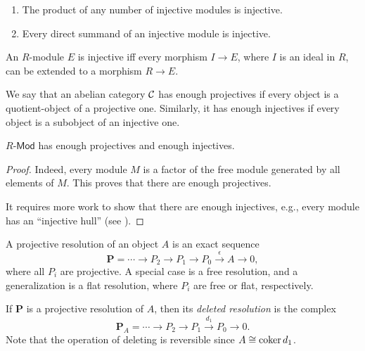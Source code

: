 \begin{prop}
    \begin{enumerate}
        \item The product of any number of injective modules is injective.
        \item Every direct summand of an injective module is injective.
    \end{enumerate}
\end{prop}

\begin{thm}
    An $R$-module $E$ is injective iff every morphism $I\to E$, where $I$ is an ideal in $R$, can be extended to a morphism $R\to E$.
\end{thm}


\begin{defn}
    We say that an abelian category $\mathcal{C}$ has enough projectives if every object is a quotient-object of a projective one. Similarly, it has enough injectives if every object is a subobject of an injective one.
\end{defn}

\begin{prop}
    $R\text{-}\mathsf{Mod}$ has enough projectives and enough injectives. 
\end{prop}
\begin{proof}
     Indeed, every module $M$ is a factor of the free module generated by all elements of $M$. This proves that there are enough projectives. 
     
     It requires more work to show that there are enough injectives, e.g., every module has an ``injective hull'' (see \cite[Thm. 3.38]{Rotman}).
\end{proof}

\begin{defn}
    A projective resolution of an object $A$ is an exact sequence
    \[\bm{P}=\cdots \to P_2\to P_1\to P_0\overset\epsilon\to A\to 0,\]
    where all $P_i$ are projective. A special case is a free resolution, and a generalization is a flat resolution, where $P_i$ are free or flat, respectively.
    
    If $\bm{P}$ is a projective resolution of $A$, then its \emph{deleted resolution} is the complex
    \[\bm{P}_A=\cdots\to P_2\to P_1\overset{d_1}\to P_0\to 0.\]
    Note that the operation of deleting is reversible since $A\cong \operatorname{coker} d_1$.
\end{defn}



